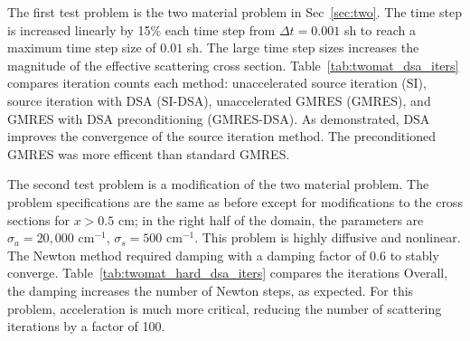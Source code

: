 {The first test problem is the two material
problem in Sec~\ref{sec:two}.     The time step is increased linearly by 15\% each time step from $\Delta
t=0.001$ sh to reach a maximum time step size of $0.01$ sh.  The large time step sizes
increases the magnitude of the effective scattering cross section.
Table~\ref{tab:twomat_dsa_iters} compares iteration counts each method: unaccelerated
source iteration (SI), source iteration with DSA (SI-DSA), unaccelerated GMRES (GMRES),
and GMRES with DSA preconditioning (GMRES-DSA).  As demonstrated, DSA improves the
convergence of the source iteration method.  The preconditioned GMRES was more efficent
than standard GMRES.

The second test problem is a modification of the two material problem. The problem
specifications are the same as before except for modifications to the cross sections for
$x>0.5$ cm; in the right half of the domain, the
parameters are $\sigma_a = 20,000$ cm$^{-1}$, $\sigma_s=500 $ cm$^{-1}$.  This problem is
highly diffusive and nonlinear. The Newton method required damping with a damping factor of $0.6$ to
stably converge.  Table~\ref{tab:twomat_hard_dsa_iters} compares the iterations
Overall, the damping increases the number of Newton steps, as expected. For this problem,
acceleration is much more critical, reducing the number of scattering iterations by a
factor of 100.  

}
